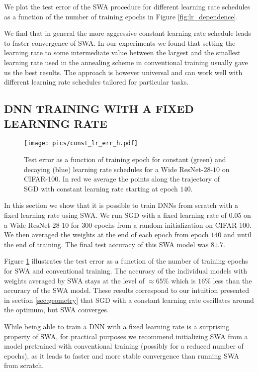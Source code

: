 \documentclass[letterpaper]{article}
\begin{document}
We plot the test error of the SWA procedure for different learning rate schedules 
as a function of the number of training epochs in Figure \ref{fig:lr_dependence}.

We find that in general the more aggressive constant learning rate schedule leads
to faster convergence of SWA. In our experiments we found that setting the 
learning rate to some 
intermediate value between the largest and the smallest learning rate
used in the annealing scheme in conventional training usually gave us the best
results.
The approach is however universal and can work well
with different learning rate schedules tailored for particular tasks.

\subsection{DNN TRAINING WITH A FIXED LEARNING RATE}
\label{sec:const_lr}

\begin{figure}[!h]
	\centering
	\texttt{[image: pics/const\_lr\_err\_h.pdf]}
	\caption{Test error as a function of training epoch for constant (green) and 
  decaying (blue) learning rate schedules for 
  a Wide ResNet-$28$-$10$ on CIFAR-100. In red we average
  the points along the 
  trajectory of SGD with constant learning rate starting at epoch $140$.}
  \label{fig:wrn_convergence}
\end{figure}

In this section we show that it is possible to train DNNs from scratch with a fixed
learning rate using SWA. We run SGD with a fixed learning rate of 
$0.05$ on a Wide ResNet-$28$-$10$ \citep{zagoruyko2016wide} for $300$ epochs from 
a random initialization on CIFAR-100.
We then averaged the weights at the end of
each epoch from epoch $140$ and until the end of training. The final test
accuracy of this SWA model was $81.7$. 

Figure \ref{fig:wrn_convergence} illustrates
the test error as a function of the number of training epochs
for SWA and conventional training. The accuracy of the individual
models with weights averaged by SWA stays at the level of $\approx 65\%$ which is $16 \%$
less than the accuracy of the SWA model.  These results correspond 
to our intuition presented in section \ref{sec:geometry}
that SGD with a constant learning rate oscillates around the 
optimum, but SWA converges.

While being able to train a DNN with a fixed learning rate is a surprising property
of SWA, for practical purposes we recommend initializing SWA from a model
pretrained with conventional training (possibly for a reduced number of epochs),
as it leads to faster and more stable convergence than running SWA from scratch.
\end{document}
